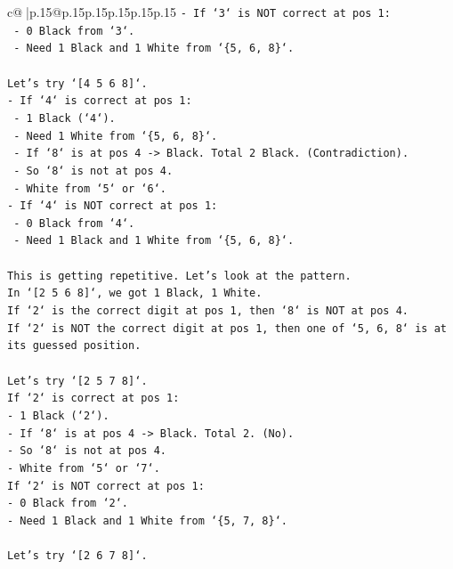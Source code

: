 \documentclass{article}
\begin{document}
{\begin{supertabular}{c@{$\;$}|p{.15\linewidth}@{}p{.15\linewidth}p{.15\linewidth}p{.15\linewidth}p{.15\linewidth}p{.15\linewidth}}
{{{\texttt{{-} If `3` is NOT correct at pos 1:} \\
\texttt{    {-} 0 Black from `3`.} \\
\texttt{    {-} Need 1 Black and 1 White from `\{5, 6, 8\}`.} \\
\\ 
\texttt{Let's try `{[}4 5 6 8{]}`.} \\
\texttt{{-} If `4` is correct at pos 1:} \\
\texttt{    {-} 1 Black (`4`).} \\
\texttt{    {-} Need 1 White from `\{5, 6, 8\}`.} \\
\texttt{    {-} If `8` is at pos 4 {-}> Black. Total 2 Black. (Contradiction).} \\
\texttt{    {-} So `8` is not at pos 4.} \\
\texttt{    {-} White from `5` or `6`.} \\
\texttt{{-} If `4` is NOT correct at pos 1:} \\
\texttt{    {-} 0 Black from `4`.} \\
\texttt{    {-} Need 1 Black and 1 White from `\{5, 6, 8\}`.} \\
\\ 
\texttt{This is getting repetitive. Let's look at the pattern.} \\
\texttt{In `{[}2 5 6 8{]}`, we got 1 Black, 1 White.} \\
\texttt{If `2` is the correct digit at pos 1, then `8` is NOT at pos 4.} \\
\texttt{If `2` is NOT the correct digit at pos 1, then one of `5, 6, 8` is at its guessed position.} \\
\\ 
\texttt{Let's try `{[}2 5 7 8{]}`.} \\
\texttt{If `2` is correct at pos 1:} \\
\texttt{{-} 1 Black (`2`).} \\
\texttt{{-} If `8` is at pos 4 {-}> Black. Total 2. (No).} \\
\texttt{{-} So `8` is not at pos 4.} \\
\texttt{{-} White from `5` or `7`.} \\
\texttt{If `2` is NOT correct at pos 1:} \\
\texttt{{-} 0 Black from `2`.} \\
\texttt{{-} Need 1 Black and 1 White from `\{5, 7, 8\}`.} \\
\\ 
\texttt{Let's try `{[}2 6 7 8{]}`.} \\
}}}
\end{supertabular}}
\end{document}

